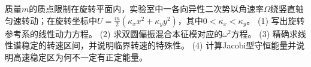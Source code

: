 质量\(m\)的质点限制在旋转平面内，实验室中一各向异性二次势以角速率\(\Omega\)绕竖直轴匀速转动；在旋转坐标中\(U=\frac m2(\kappa_x x^2+\kappa_y y^2)\)，其中\(0<\kappa_x<\kappa_y\)。
(1) 写出旋转参考系的线性动力方程。
(2) 求双圆偏振混合本征模对应的\(\omega^2\)方程。
(3) 精确求线性谱稳定的转速区间，并说明临界转速的特殊性。
(4) 计算Jacobi型守恒能量并说明高速稳定区为何不一定有正定能量。
